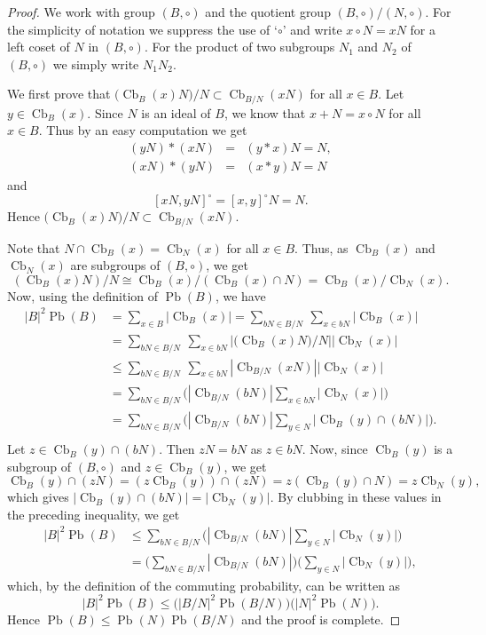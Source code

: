 \documentclass[10pt,a4paper]{amsart}
\newcommand{\Cb}{\operatorname{Cb} }
\newcommand{\Pb}{\operatorname{Pb} }
\begin{document}
\begin{proof}
We work with group $(B, \circ)$ and the quotient group $(B, \circ)/(N, \circ)$. For the simplicity of notation we suppress the use of `$\circ$' and write $x \circ N = xN$ for a left coset of $N$ in $(B, \circ)$. For the product of two subgroups $N_1$ and $N_2$  of $(B, \circ)$ we simply write $N_1 N_2$.

 We first prove that $({\Cb_{B}(x)  N)/N} \subset \Cb_{B/N}(x  N)$ for all $x\in B$. Let $y \in \Cb_{B}(x)$.  Since $N$ is an ideal of $B$, we know that 
  $x + N = x \circ N$ for all $x \in B$. Thus by an easy computation we get 
 \begin{eqnarray*}
 (y  N) * (x  N) &=& (y*x)  N  = N,\\
  (x  N) * (y  N) &=& (x*y)  N  = N
  \end{eqnarray*}
  and 
  $$[x N, y  N]^{\circ} = [x, y]^{\circ}  N  = N.$$
Hence $({\Cb_{B}(x)  N)/N} \subset \Cb_{B/N}(x N)$.

Note that $N \cap \Cb_B(x) = \Cb_N(x)$ for all $x \in B$. Thus, as $\Cb_B(x)$ and  $\Cb_N(x)$ are subgroups of $(B, \circ)$, we get
$$(\Cb_B(x)  N)/N \cong \Cb_B(x)/(\Cb_B(x) \cap N) = \Cb_B(x)/\Cb_N(x).$$
Now, using the definition of $\Pb(B)$, we have
\begin{align*}
  |B|^2\Pb(B) &=\sum_{x\in B}|\Cb_{B}(x)| =\sum_{b N\in{B/N}} ~ \sum_{x\in b N}|\Cb_{B}(x)|\\
             &=\sum_{ b N\in{B/N}} ~ \sum_{x\in b N}|{(\Cb_{B}(x) N})/N||\Cb_N(x)|\\
             &\leqslant \sum_{b N\in{B/N}} ~ \sum_{x \in bN}|\Cb_{B/N}(x N)| |\Cb_N(x)|\\  
             &= \sum_{b N\in{B/N}}\Big(|\Cb_{B/N}(b N)|\sum_{x\in b N}|\Cb_N(x)|\Big)\\   
             &= \sum_{b N\in{B/N}}\Big(|\Cb_{B/N}(b N)|  \sum_{y\in N}|\Cb_{B}(y)\cap (b N)|\Big).\\                      
      \end{align*}
      Let $z \in   \Cb_B(y) \cap (b N)$.  Then $z N = b N$ as $z \in b  N$. Now, since $\Cb_{B}(y)$ is a subgroup of $(B, \circ)$ and $z \in \Cb_B(y)$, we get
      $$\Cb_{B}(y)\cap (z N) = (z \Cb_{B}(y)) \cap (z N) = z (\Cb_{B}(y)\cap N) = z   \Cb_N(y),$$
     which gives $|\Cb_{B}(y)\cap(b N)| = |\Cb_N(y)|$. By clubbing in these values in the preceding inequality, we get 
    \begin{align*}
        |B|^2\Pb(B) &\leqslant \sum_{bN\in B/N} \Big(|\Cb_{B/N}(b  N)| \sum_{y\in N}|\Cb_{N}(y)|\Big)\\
        &= \Big(\sum_{bN\in B/N} |\Cb_{B/N}(b  N)| \Big) \Big(\sum_{y\in N}|\Cb_{N}(y)|\Big),
    \end{align*}
      which, by the definition of the commuting probability,  can be written as
     $$|B|^2\Pb(B)\leqslant \big(|B/N|^2\Pb(B/N)\big)\big(|N|^2\Pb(N)\big).$$   
     Hence   $\Pb(B)\leqslant \Pb(N)\Pb(B/N)$ and the proof is complete. 
\end{proof}
\end{document}
